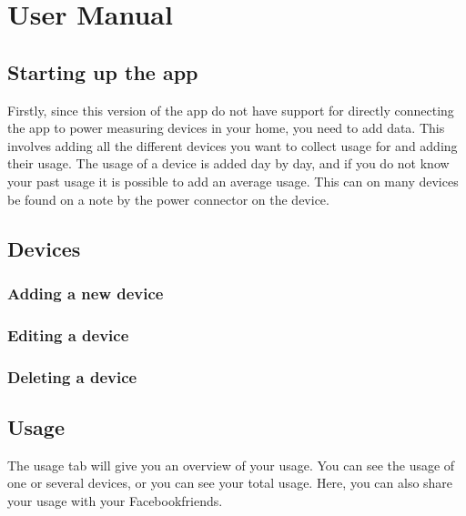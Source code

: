 \chapter{User Manual}


\section{Starting up the app}
Firstly, since this version of the app do not have support for directly connecting the app to power measuring devices in your home, you need to add data. This involves adding all the different devices you want to collect usage for and adding their usage. The usage of a device is added day by day, and if you do not know your past usage it is possible to add an average usage. This can on many devices be found on a note by the power connector on the device.


\label{sec:devices}
\section{Devices}
\subsection{Adding a new device}
\subsection{Editing a device}
\subsection{Deleting a device}


\section{Usage}
The usage tab will give you an overview of your usage. You can see the usage of one or several devices, or you can see your total usage. Here, you can also share your usage with your Facebookfriends.
